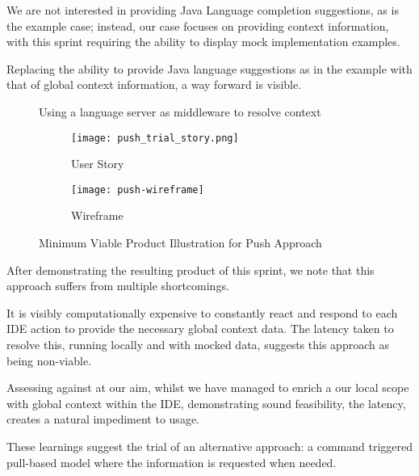 We are not interested in providing Java Language completion suggestions, as is the example case; instead, our case focuses on providing context information, with this sprint requiring the ability to display mock implementation examples.

Replacing the ability to provide Java language suggestions as in the example with that of global context information, a way forward is visible.

\begin{figure}[h!]
	
	\caption{Using a language server as middleware to resolve context}
\end{figure}

\begin{figure}[h!]
    \centering
	\begin{subfigure}[t]{0.3\textwidth}
		\texttt{[image: push\_trial\_story.png]}
		\caption{User Story}
	\end{subfigure}
	\begin{subfigure}[t]{0.6\textwidth}
		\texttt{[image: push-wireframe]}
		\caption{Wireframe}
	\end{subfigure}
	\label{fig:mvpPush}
	\caption{Minimum Viable Product Illustration for Push Approach}
\end{figure}

After demonstrating the resulting product of this sprint, we note that this approach suffers from multiple shortcomings.

It is visibly computationally expensive to constantly react and respond to each IDE action to provide the necessary global context data. The latency taken to resolve this, running locally and with mocked data, suggests this approach as being non-viable. 

Assessing against at our aim, whilst we have managed to enrich a our local scope with global context within the IDE, demonstrating sound feasibility, the latency, creates a natural impediment to usage.

These learnings suggest the trial of an alternative approach: a command triggered pull-based model where the information is requested when needed.

